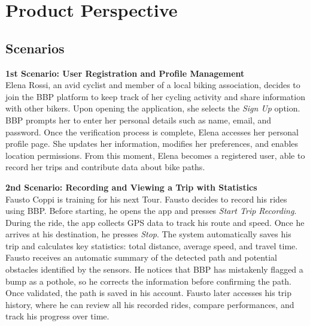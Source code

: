 \section{Product Perspective}
\label{sec:product_Perspective}

\subsection{Scenarios}
\label{subsec:scenarios}

\item \textbf{1st Scenario: User Registration and Profile Management}\\
Elena Rossi, an avid cyclist and member of a local biking association, decides to join the BBP platform to keep track of her cycling activity and share information with other bikers. 
Upon opening the application, she selects the \textit{Sign Up} option. BBP prompts her to enter her personal details such as name, email, and password. Once the verification process is complete, Elena accesses her personal profile page. She updates her information, modifies her preferences, and enables location permissions. From this moment, Elena becomes a registered user, able to record her trips and contribute data about bike paths.

\item \textbf{2nd Scenario: Recording and Viewing a Trip with Statistics}\\
Fausto Coppi is training for his next Tour. Fausto decides to record his rides using BBP. Before starting, he opens the app and presses \textit{Start Trip Recording}. 
During the ride, the app collects GPS data to track his route and speed. Once he arrives at his destination, he presses \textit{Stop}. The system automatically saves his trip and calculates key statistics: total distance, average speed, and travel time.  Fausto receives an automatic summary of the detected path and potential obstacles identified by the sensors. He notices that BBP has mistakenly flagged a bump as a pothole, so he corrects the information before confirming the path. Once validated, the path is saved in his account.
Fausto later accesses his trip history, where he can review all his recorded rides, compare performances, and track his progress over time.

